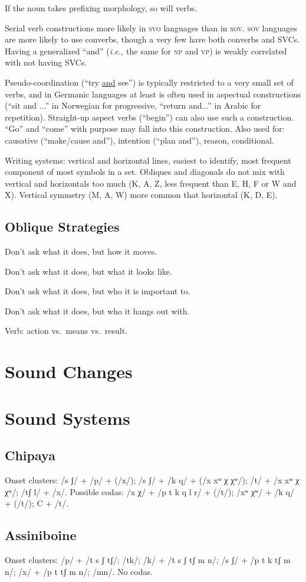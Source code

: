 \documentclass[11pt]{article}
\newcommand{\I}[1]{\textsc{#1}}   %
\begin{document}
If the noun takes prefixing morphology, so will verbs.

Serial verb constructions more likely in \I{svo} languages than in
\I{sov}.  \I{sov} languages are more likely to use converbs, though a
very few have both converbs and SVCs.  Having a generalized ``and''
(\textit{i.e.,} the same for \I{np} and \I{vp}) is weakly correlated
with not having SVCs.

Pseudo-coordination (``try \uline{and} see'') is typically restricted
to a very small set of verbs, and in Germanic languages at least is
often used in aspectual constructions (``sit and ...'' in Norwegian
for progressive, ``return and...'' in Arabic for repetition).
Straight-up aspect verbs (``begin'') can also use such a
construction. ``Go'' and ``come'' with purpose may fall into this
construction.  Also used for: causative (``make/cause and''),
intention (``plan and''), reason, conditional.

Writing systems: vertical and horizontal lines, easiest to identify,
most frequent component of most symbols in a set. Obliques and
diagonals do not mix with vertical and horizontals too much (K, A, Z,
less frequent than E, H, F or W and X). Vertical symmetry (M, A, W)
more common that horizontal (K, D, E).

\subsection{Oblique Strategies}
Don't ask what it does, but how it moves.

Don't ask what it does, but what it looks like.

Don't ask what it does, but who it is important to.

Don't ask what it does, but who it hangs out with.

Verb: action vs.\ means vs.\ result.

\section{Sound Changes}
{\small

}

\section{Sound Systems}

\subsection{Chipaya} Onset clusters: /s ʃ/ + /p/ + (/x/); /s ʃ/ + /k q/ +
(/x xʷ χ χʷ/); /t/ + /x xʷ χ χʷ/; /tʃ l/ + /x/.  Possible codas: /x χ/
+ /p t k q l r/ + (/t/); /xʷ χʷ/ + /k q/ + (/t/); C + /t/. 

\subsection{Assiniboine} Onset clusters: /p/ + /t s ʃ tʃ/; /tk/; /k/ +
/t s ʃ tʃ m n/; /s ʃ/ + /p t k tʃ m n/; /x/ + /p t tʃ m n/; /mn/.  No
codas. 
\end{document}
